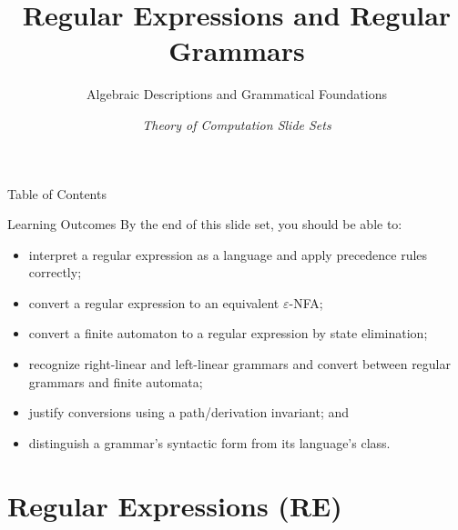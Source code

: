 \documentclass[10pt]{beamer}
\title{Regular Expressions and Regular Grammars}
\subtitle{Algebraic Descriptions and Grammatical Foundations}
\author[SDB]{}
\date{\scriptsize \textit{Theory of Computation Slide Sets}}
\begin{document}
\begin{frame}
  \titlepage
\end{frame}

\begin{frame}{Table of Contents}
  \tableofcontents
\end{frame}

\begin{frame}{Learning Outcomes}
  By the end of this slide set, you should be able to:
  \begin{itemize}
    \item interpret a regular expression as a language and apply precedence
      rules correctly;
    \item convert a regular expression to an equivalent $\varepsilon$-NFA;
    \item convert a finite automaton to a regular expression by state
      elimination;
    \item recognize right-linear and left-linear grammars and convert between
      regular grammars and finite automata;
    \item justify conversions using a path/derivation invariant; and
    \item distinguish a grammar's syntactic form from its language's class.
  \end{itemize}
\end{frame}

\section{Regular Expressions (RE)}
\end{document}
